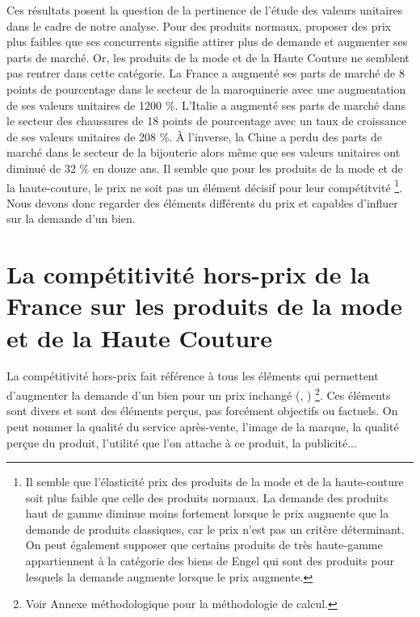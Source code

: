 \documentclass[french,10pt,a4paper]{article}
\begin{document}
Ces résultats posent la question de la pertinence de l'étude des valeurs unitaires dans le cadre de notre analyse. Pour des produits \og normaux\fg{}, proposer des prix plus faibles que ses concurrents signifie attirer plus de demande et augmenter ses parts de marché. Or, les produits de la mode et de la Haute Couture ne semblent pas rentrer dans cette catégorie. La France a augmenté ses parts de marché de 8 points de pourcentage dans le secteur de la maroquinerie avec une augmentation de ses valeurs unitaires de 1200 \%. L'Italie a augmenté ses parts de marché dans le secteur des chaussures de 18 points de pourcentage avec un taux de croissance de ses valeurs unitaires de 208 \%. À l'inverse, la Chine a perdu des parts de marché dans le secteur de la bijouterie alors même que ses valeurs unitaires ont diminué de 32 \% en douze ans. Il semble que pour les produits de la mode et de la haute-couture, le prix ne soit pas un élément décisif pour leur compétitvité \footnote{Il semble que l'élasticité prix des produits de la mode et de la haute-couture soit plus faible que celle des produits \og normaux\fg{}. La demande des produits haut de gamme diminue moins fortement lorsque le prix augmente que la demande de produits classiques, car le prix n'est pas un critère déterminant. On peut également supposer que certains produits de très haute-gamme appartiennent à la catégorie des biens de \og Engel\fg{} qui sont des produits pour lesquels la demande augmente lorsque le prix augmente.}. Nous devons donc regarder des éléments différents du prix et capables d'influer sur la demande d'un bien. 






\newpage
{}
\section{La compétitivité hors-prix de la France sur les produits de la mode et de la Haute Couture}

La compétitivité hors-prix fait référence à tous les éléments qui permettent d'augmenter la demande d'un bien pour un prix inchangé (\cite{Khandelwal2013}, \cite{Bas2015}) \footnote{Voir Annexe méthodologique pour la méthodologie de calcul.}. Ces éléments sont divers et sont des éléments perçus, pas forcément objectifs ou factuels. On peut nommer la qualité du service après-vente, l'image de la marque, la qualité perçue du produit, l'utilité que l'on attache à ce produit, la publicité... 
\end{document}
